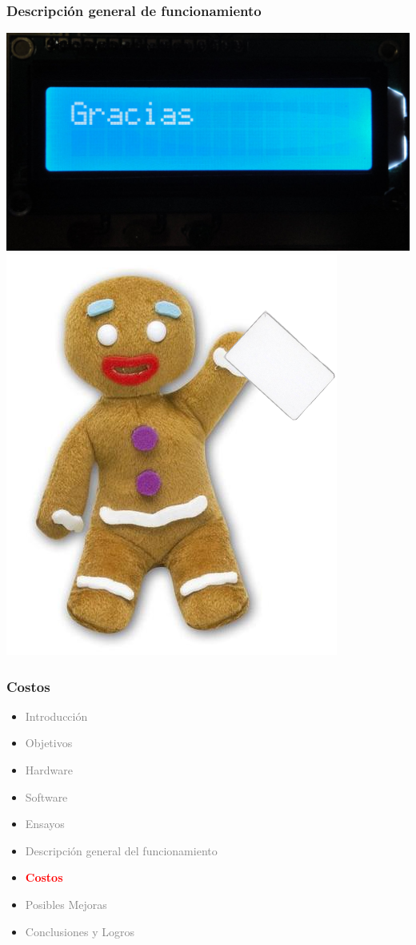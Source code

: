 \documentclass{beamer}
\begin{document}
\begin{frame}
	\frametitle{Descripción general de funcionamiento}
	\begin{center}
		\includegraphics[scale=.08]{Imagenes/grax.jpg}
		\includegraphics[scale=.35]{Imagenes/pinpon_tarj.png}
	\end{center}
\end{frame}	

\begin{frame}
	\frametitle{Costos}
	\begin{itemize}
		\item \textcolor{gray}{Introducción}
		\item \textcolor{gray}{Objetivos}
		\item \textcolor{gray}{Hardware}
		\item \textcolor{gray}{Software}
		\item \textcolor{gray}{Ensayos}
		\item \textcolor{gray}{Descripción general del funcionamiento}
		\item \textcolor{red}{\bf{Costos}}
		\item \textcolor{gray}{Posibles Mejoras}
		\item \textcolor{gray}{Conclusiones y Logros}
	\end{itemize}
\end{frame}
\end{document}
